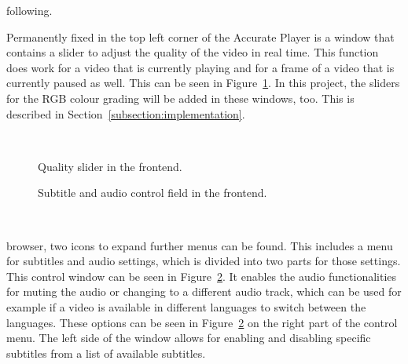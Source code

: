 \documentclass[../MasterThesis.tex]{subfiles}
\begin{document}
\begin{minipage}{0.5\textwidth}
%	
\vspace*{0.7em}
following.

	
Permanently fixed in the top left corner of the Accurate Player is a window that contains a slider to adjust the quality of the video in real time. This function does work for a video that is currently playing and for a frame of a video that is currently paused as well. This can be seen in Figure~\ref{figure:qualityslider}. 
In this project, the sliders for the RGB colour grading will be added in these windows, too. This is described in Section~\ref{subsection:implementation}.

\end{minipage}\begin{minipage}{0.05\textwidth}
	\ 
\end{minipage}\begin{minipage}{0.45\textwidth}
	
\begin{figure}[H]
	\begin{center}
		\caption[Quality slider in the frontend.]{Quality slider in the frontend.}
		\label{figure:qualityslider} 
	\end{center}
\end{figure}
\end{minipage}

\vspace*{0.2em}

\begin{minipage}{0.5\textwidth}
	\begin{figure}[H]
		\begin{center}
			\caption[Subtitle and audio control field in the frontend.]{Subtitle and audio control field in the frontend.}
			\label{figure:subtitles}
		\end{center}
	\end{figure}
\vfill
\end{minipage}\begin{minipage}{0.05\textwidth}
	\ 
\end{minipage}\begin{minipage}{0.45\textwidth}
browser, two icons to expand further menus can be found. 
This includes a menu for subtitles and audio settings, which is divided into two parts for those settings. This control window can be seen in Figure~\ref{figure:subtitles}. It enables the audio functionalities for muting the audio or changing to a different audio track, which can be used for example if a video is available in different languages to switch between the languages. These options can be seen in Figure~\ref{figure:subtitles} on the right part of the control menu.
The left side of the window allows for enabling and disabling specific subtitles from a list of available subtitles. 
%
%
\end{minipage}
\end{document}
